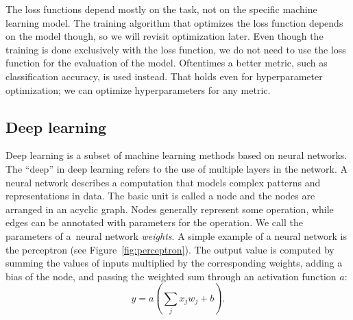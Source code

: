 The loss functions depend mostly on the task, not on the specific machine learning model. The training algorithm that optimizes the loss function depends on the model though, so we will revisit optimization later. Even though the training is done exclusively with the loss function, we do not need to use the loss function for the evaluation of the model. Oftentimes a better metric, such as classification accuracy, is used instead. That holds even for hyperparameter optimization; we can optimize hyperparameters for any metric.

\subsection{Deep learning}
Deep learning is a subset of machine learning methods based on neural networks. The ``deep'' in deep learning refers to the use of multiple layers in the network. A neural network describes a computation that models complex patterns and representations in data. The basic unit is called a node and the nodes are arranged in an acyclic graph. Nodes generally represent some operation, while edges can be annotated with parameters for the operation. We call the parameters of a~neural network \textit{weights}. A simple example of a neural network is the perceptron (see Figure~\ref{fig:perceptron}). The output value is computed by summing the values of inputs multiplied by the corresponding weights, adding a bias of the node, and passing the weighted sum through an activation function $a$:
\begin{equation}
y = a(\sum_j x_jw_j + b).
\label{eq:node}
\end{equation}

